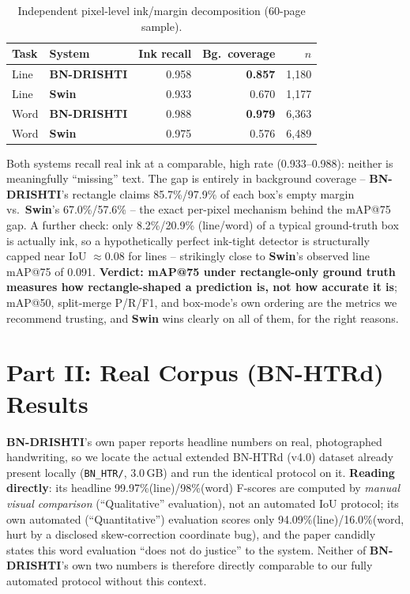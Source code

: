 \documentclass[10pt]{article}
\newcommand{\swin}{\textbf{Swin}}
\newcommand{\bnd}{\textbf{BN-DRISHTI}}
\begin{document}
\begin{table}[H]
\centering
\footnotesize
\caption{Independent pixel-level ink/margin decomposition (60-page sample).}
\begin{tabular}{@{}llrrr@{}}
\toprule
Task & System & Ink recall & Bg.\ coverage & $n$ \\
\midrule
Line & \bnd{}         & 0.958 & \textbf{0.857} & 1{,}180 \\
Line & \textbf{Swin} & 0.933 & 0.670 & 1{,}177 \\
Word & \bnd{}         & 0.988 & \textbf{0.979} & 6{,}363 \\
Word & \textbf{Swin} & 0.975 & 0.576 & 6{,}489 \\
\bottomrule
\end{tabular}
\end{table}

Both systems recall real ink at a comparable, high rate (0.933--0.988): neither is
meaningfully ``missing'' text. The gap is entirely in background coverage --
\bnd's rectangle claims 85.7\%/97.9\% of each box's empty margin vs.\ \swin's
67.0\%/57.6\% -- the exact per-pixel mechanism behind the mAP@75 gap. A further
check: only 8.2\%/20.9\% (line/word) of a typical ground-truth box is actually ink, so
a hypothetically perfect ink-tight detector is structurally capped near IoU
$\approx$0.08 for lines -- strikingly close to \swin's observed line mAP@75 of 0.091.
\textbf{Verdict: mAP@75 under rectangle-only ground truth measures how
rectangle-shaped a prediction is, not how accurate it is}; mAP@50, split-merge P/R/F1,
and box-mode's own ordering are the metrics we recommend trusting, and \swin{} wins
clearly on all of them, for the right reasons.

\section{Part II: Real Corpus (BN-HTRd) Results}

\bnd's own paper reports headline numbers on real, photographed handwriting, so we
locate the actual extended BN-HTRd (v4.0) dataset already present locally
(\texttt{BN\_HTR/}, 3.0\,GB) and run the identical protocol on it. \textbf{Reading
\cite{jubaer2023bndrishti} directly}: its headline 99.97\%(line)/98\%(word) F-scores
are computed by \emph{manual visual comparison} (``Qualitative'' evaluation), not an
automated IoU protocol; its own automated (``Quantitative'') evaluation scores only
94.09\%(line)/16.0\%(word, hurt by a disclosed skew-correction coordinate bug), and
the paper candidly states this word evaluation ``does not do justice'' to the system.
Neither of \bnd's own two numbers is therefore directly comparable to our fully
automated protocol without this context.
\end{document}
